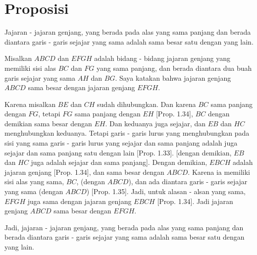\documentclass[a4paper]{book}
\begin{document}
\section*{\centering Proposisi \thesection} 
Jajaran - jajaran genjang, yang berada pada alas yang sama panjang dan berada
diantara garis - garis sejajar yang sama adalah sama besar satu dengan yang 
lain.
\begin{center}
\end{center}
Misalkan $ABCD$ dan $EFGH$ adalah bidang - bidang jajaran genjang yang memiliki
sisi alas $BC$ dan $FG$ yang sama panjang, dan berada diantara dua buah garis
sejajar yang sama $AH$ dan $BG$. Saya katakan bahwa jajaran genjang $ABCD$ sama
besar dengan jajaran genjang $EFGH$.

Karena misalkan $BE$ dan $CH$ sudah dihubungkan. Dan karena $BC$ sama panjang 
dengan $FG$, tetapi $FG$ sama panjang dengan $EH$ [Prop. 1.34], $BC$ dengan 
demikian sama besar dengan $EH$. Dan keduanya juga sejajar, dan $EB$ dan $HC$
menghubungkan keduanya. Tetapi garis - garis lurus yang menghubungkan pada sisi 
yang sama garis - garis lurus yang sejajar dan sama panjang adalah juga sejajar
dan sama panjang satu dengan lain [Prop. 1.33]. [dengan demikian, $EB$ dan $HC$
juga adalah sejajar dan sama panjang]. Dengan demikian, $EBCH$ adalah jajaran 
genjang [Prop. 1.34], dan sama besar dengan $ABCD$. Karena ia memiliki sisi
alas yang  sama, $BC$, (dengan $ABCD$), dan  ada diantara garis -  garis 
sejajar yang sama (dengan $ABCD$) [Prop. 1.35]. Jadi, untuk alasan - alsan yang
sama, $EFGH$ juga sama dengan jajaran genjang $EBCH$ [Prop. 1.34]. Jadi jajaran
genjang $ABCD$ sama besar dengan $EFGH$.

Jadi, jajaran - jajaran genjang, yang berada pada alas yang sama panjang dan
 berada diantara garis - garis sejajar yang sama adalah sama besar satu 
dengan yang lain.

\end{document}
